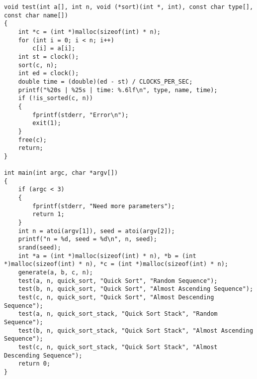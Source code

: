 \documentclass[12pt]{article}
\begin{document}
{\begin{lstlisting}
void test(int a[], int n, void (*sort)(int *, int), const char type[], const char name[])
{
    int *c = (int *)malloc(sizeof(int) * n);
    for (int i = 0; i < n; i++)
        c[i] = a[i];
    int st = clock();
    sort(c, n);
    int ed = clock();
    double time = (double)(ed - st) / CLOCKS_PER_SEC;
    printf("%20s | %25s | time: %.6lf\n", type, name, time);
    if (!is_sorted(c, n))
    {
        fprintf(stderr, "Error\n");
        exit(1);
    }
    free(c);
    return;
}

int main(int argc, char *argv[])
{
    if (argc < 3)
    {
        fprintf(stderr, "Need more parameters");
        return 1;
    }
    int n = atoi(argv[1]), seed = atoi(argv[2]);
    printf("n = %d, seed = %d\n", n, seed);
    srand(seed);
    int *a = (int *)malloc(sizeof(int) * n), *b = (int *)malloc(sizeof(int) * n), *c = (int *)malloc(sizeof(int) * n);
    generate(a, b, c, n);
    test(a, n, quick_sort, "Quick Sort", "Random Sequence");
    test(b, n, quick_sort, "Quick Sort", "Almost Ascending Sequence");
    test(c, n, quick_sort, "Quick Sort", "Almost Descending Sequence");
    test(a, n, quick_sort_stack, "Quick Sort Stack", "Random Sequence");
    test(b, n, quick_sort_stack, "Quick Sort Stack", "Almost Ascending Sequence");
    test(c, n, quick_sort_stack, "Quick Sort Stack", "Almost Descending Sequence");
    return 0;
}
\end{lstlisting}
}
\end{document}
